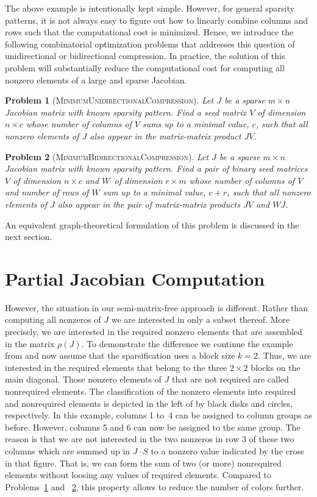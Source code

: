 \documentclass[12pt, oneside]{book}
\newtheorem{problem}{Problem}
\newcommand{\col}{\ensuremath{c}}
\newcommand{\row}{\ensuremath{r}}
\newcommand{\sparsifysymbol}{\ensuremath{\rho}}
\newcommand{\sparsify}[1]{\ensuremath{\sparsifysymbol(#1)}}
\newcommand{\MinUniCom}{\textsc{MinimumUnidirectionalCompression}}
\newcommand{\MinBidCom}{\textsc{MinimumBidirectionalCompression}}
\begin{document}
The above example is intentionally kept simple. However, for general sparsity patterns,
it is not always easy to figure out how to linearly combine columns and rows such that
the computational cost is minimized. Hence, we introduce the following combinatorial
optimization problems that addresses this question of unidirectional or bidirectional compression. 
In practice, the solution of this
problem will substantially reduce the computational cost for computing all nonzero
elements of a large and sparse Jacobian.

\begin{problem}[\MinUniCom]
\label{p.seed.uni} Let $J$ be a sparse ${m\times n}$ Jacobian matrix with known sparsity
pattern. Find a seed matrix $V$ of dimension $n\times \col$ 
whose number of columns of $V$ sums up
to a minimal value, $\col$, such that all nonzero elements of $J$ also appear in
the matrix-matrix product $JV$.
\end{problem}

\begin{problem}[\MinBidCom]
\label{p.seed.bid} Let $J$ be a sparse ${m\times n}$ Jacobian matrix with known sparsity
pattern. Find a pair of binary seed matrices $V$ of dimension $n\times \col$ and $W$~of
dimension $\row \times m$ whose number of columns of $V$ and number of rows of $W$ sum up
to a minimal value, $\col + \row$, such that all nonzero elements of $J$ also appear in
the pair of matrix-matrix products $JV$ and $WJ$.
\end{problem}

An equivalent graph-theoretical formulation of this problem is discussed in the next
section.

\section{Partial Jacobian Computation}

However, the situation in our semi-matrix-free approach is different. Rather than
computing all nonzeros of $J$ we are interested in only a subset thereof. More precisely,
we are interested in the required nonzero elements that are assembled in the matrix
\sparsify{J}. To demonstrate the difference we continue the example from 
and now assume that the sparsification uses a block size $k=2$. Thus, we are interested
in the required elements that belong to the three $2 \times 2$ blocks on the main
diagonal. Those nonzero elements of $J$ that are not required are called nonrequired
elements. The classification of the nonzero elements into required and nonrequired
elements is depicted in the left of 
by black disks and circles,
respectively. In this example, columns 1 to~4 can be assigned to column groups as before.
However, columns 5 and 6 can now be assigned to the same group. The reason is that we are
not interested in the two nonzeros in row 3 of these two columns which are summed up in
$J\cdot S$ to a nonzero value indicated by the cross in that figure. That is, we can form
the sum of two (or more) nonrequired elements without loosing any values of required
elements. Compared to Problems~\ref{p.seed.uni} and ~\ref{p.seed.bid}, 
this property allows to reduce the number of
colors further.
\end{document}

